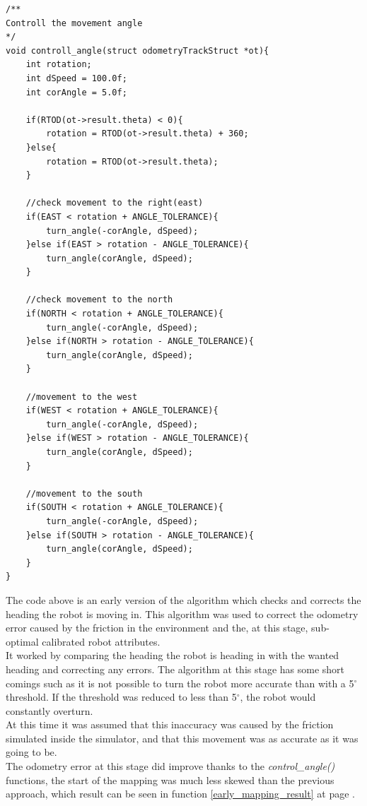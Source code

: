 \begin{lstlisting}[caption={Early heading correction algorithm}, label={early_heading}]
 /**
Controll the movement angle
*/
void controll_angle(struct odometryTrackStruct *ot){
	int rotation;
	int dSpeed = 100.0f;
	int corAngle = 5.0f;

	if(RTOD(ot->result.theta) < 0){
		rotation = RTOD(ot->result.theta) + 360;
	}else{
		rotation = RTOD(ot->result.theta);
	}

	//check movement to the right(east)
	if(EAST < rotation + ANGLE_TOLERANCE){
		turn_angle(-corAngle, dSpeed);
	}else if(EAST > rotation - ANGLE_TOLERANCE){
		turn_angle(corAngle, dSpeed);
	}

	//check movement to the north
	if(NORTH < rotation + ANGLE_TOLERANCE){
		turn_angle(-corAngle, dSpeed);
	}else if(NORTH > rotation - ANGLE_TOLERANCE){
		turn_angle(corAngle, dSpeed);
	}

	//movement to the west
	if(WEST < rotation + ANGLE_TOLERANCE){
		turn_angle(-corAngle, dSpeed);
	}else if(WEST > rotation - ANGLE_TOLERANCE){
		turn_angle(corAngle, dSpeed);
	}

	//movement to the south
	if(SOUTH < rotation + ANGLE_TOLERANCE){
		turn_angle(-corAngle, dSpeed);
	}else if(SOUTH > rotation - ANGLE_TOLERANCE){
		turn_angle(corAngle, dSpeed);
	}
}
\end{lstlisting}
The code above is an early version of the algorithm which checks and corrects the heading the robot is moving in. This algorithm was used to correct the odometry error caused by the friction in the environment and the, at this stage, sub-optimal calibrated robot attributes. \\
It worked by comparing the heading the robot is heading in with the wanted heading and correcting any errors. The algorithm at this stage has some short comings such as it is not possible to turn the robot more accurate than with a 5$^{\circ}$ threshold. If the threshold was reduced to less than  5$^{\circ}$, the robot would constantly overturn. \\[3ex]

At this time it was assumed that this inaccuracy was caused by the friction simulated inside the simulator, and that this movement was as accurate as it was going to be. \\
The odometry error at this stage did improve thanks to the \textit{control\_angle()} functions, the start of the mapping was much less skewed than the previous approach, which result can be seen in function \ref{early_mapping_result} at page \pageref{early_mapping_result}. \\[3ex]

